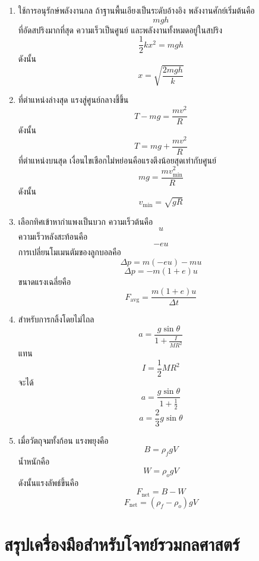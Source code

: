 \begin{enumerate}
    \item
    ใช้การอนุรักษ์พลังงานกล ถ้าฐานพื้นเอียงเป็นระดับอ้างอิง พลังงานศักย์เริ่มต้นคือ
    \[
    mgh
    \]
    ที่อัดสปริงมากที่สุด ความเร็วเป็นศูนย์ และพลังงานทั้งหมดอยู่ในสปริง
    \[
    \frac{1}{2}kx^2=mgh
    \]
    ดังนั้น
    \[
    \boxed{x=\sqrt{\frac{2mgh}{k}}}
    \]

    \item
    ที่ตำแหน่งล่างสุด แรงสู่ศูนย์กลางชี้ขึ้น
    \[
    T-mg=\frac{mv^2}{R}
    \]
    ดังนั้น
    \[
    \boxed{T=mg+\frac{mv^2}{R}}
    \]
    ที่ตำแหน่งบนสุด เงื่อนไขเชือกไม่หย่อนคือแรงตึงน้อยสุดเท่ากับศูนย์
    \[
    mg=\frac{mv_{\min}^2}{R}
    \]
    ดังนั้น
    \[
    \boxed{v_{\min}=\sqrt{gR}}
    \]

    \item
    เลือกทิศเข้าหากำแพงเป็นบวก ความเร็วต้นคือ
    \[
    u
    \]
    ความเร็วหลังสะท้อนคือ
    \[
    -eu
    \]
    การเปลี่ยนโมเมนตัมของลูกบอลคือ
    \[
    \Delta p=m(-eu)-mu
    \]
    \[
    \Delta p=-m(1+e)u
    \]
    ขนาดแรงเฉลี่ยคือ
    \[
    \boxed{F_{\text{avg}}=\frac{m(1+e)u}{\Delta t}}
    \]

    \item
    สำหรับการกลิ้งโดยไม่ไถล
    \[
    a=\frac{g\sin\theta}{1+\frac{I}{MR^2}}
    \]
    แทน
    \[
    I=\frac{1}{2}MR^2
    \]
    จะได้
    \[
    a=\frac{g\sin\theta}{1+\frac{1}{2}}
    \]
    \[
    \boxed{a=\frac{2}{3}g\sin\theta}
    \]

    \item
    เมื่อวัตถุจมทั้งก้อน แรงพยุงคือ
    \[
    B=\rho_fgV
    \]
    น้ำหนักคือ
    \[
    W=\rho_ogV
    \]
    ดังนั้นแรงลัพธ์ขึ้นคือ
    \[
    F_{\text{net}}=B-W
    \]
    \[
    \boxed{F_{\text{net}}=(\rho_f-\rho_o)gV}
    \]
\end{enumerate}
\section{สรุปเครื่องมือสำหรับโจทย์รวมกลศาสตร์}

